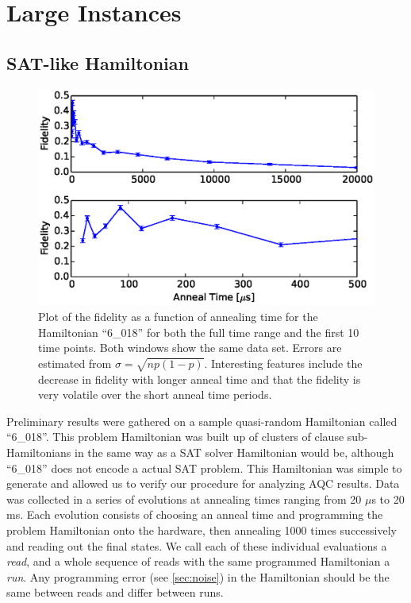 \chapter{Large Instances}
\label{chap:prelim}

\section{SAT-like Hamiltonian}
\begin{figure}[h]
	\includegraphics{img/6_018_2_fidelity.eps}
	\caption[Fidelity vs Time]{Plot of the fidelity as a function of annealing time for the Hamiltonian ``6\_018'' for both the full time range and the first 10 time points.  Both windows show the same data set.  Errors are estimated from $\sigma = \sqrt{np(1-p)}$.  Interesting features include the decrease in fidelity with longer anneal time and that the fidelity is very volatile over the short anneal time periods.}
	\label{fig:fidelity}
\end{figure}

Preliminary results were gathered on a sample quasi-random Hamiltonian called ``6\_018''.  This problem Hamiltonian was built up of clusters of clause sub-Hamiltonians in the same way as a SAT solver Hamiltonian would be, although ``6\_018'' does not encode a actual SAT problem.  This Hamiltonian was simple to generate and allowed us to verify our procedure for analyzing AQC results.
Data was collected in a series of evolutions at annealing times ranging from 20 $\mu$s to 20 ms.  Each evolution consists of choosing an anneal time and programming the problem Hamiltonian onto the hardware, then annealing 1000 times successively and reading out the final states.  We call each of these individual evaluations a \emph{read}, and a whole sequence of reads with the same programmed Hamiltonian a \emph{run}.  Any programming error (see \ref{sec:noise}) in the Hamiltonian should be the same between reads and differ between runs.


